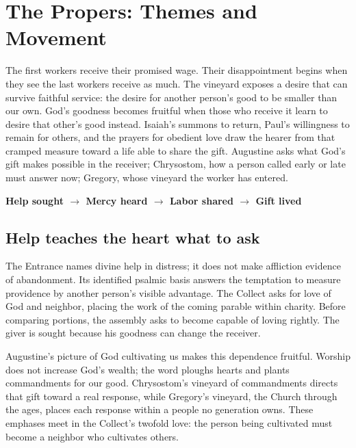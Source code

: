 
\section*{The Propers: Themes and Movement}
The first workers receive their promised wage. Their disappointment begins
when they see the last workers receive as much. The vineyard exposes a desire
that can survive faithful service: the desire for another person's good to be
smaller than our own. God's goodness becomes fruitful when those who receive
it learn to desire that other's good instead. Isaiah's summons to return,
Paul's willingness to remain for others, and the prayers for obedient love
draw the hearer from that cramped measure toward a life able to share the
gift. Augustine asks what God's gift makes possible in the receiver;
Chrysostom, how a person called early or late must answer now; Gregory, whose
vineyard the worker has entered.

\begin{center}
\textbf{Help sought $\longrightarrow$ Mercy heard $\longrightarrow$ Labor shared $\longrightarrow$ Gift lived}
\end{center}

\subsection*{Help teaches the heart what to ask}
The Entrance names divine help in distress; it does not make affliction
evidence of abandonment. Its identified psalmic basis answers the temptation
to measure providence by another person's visible advantage. The Collect asks
for love of God and neighbor, placing the work of the coming parable within
charity. Before comparing portions, the assembly asks to become capable of
loving rightly. The giver is sought because his goodness can change the
receiver.

Augustine's picture of God cultivating us makes this dependence fruitful.
Worship does not increase God's wealth; the word ploughs hearts and plants
commandments for our good. Chrysostom's vineyard of commandments directs that
gift toward a real response, while Gregory's vineyard, the Church through the
ages, places each response within a people no generation owns. These emphases
meet in the Collect's twofold love: the person being cultivated must become a
neighbor who cultivates others.

